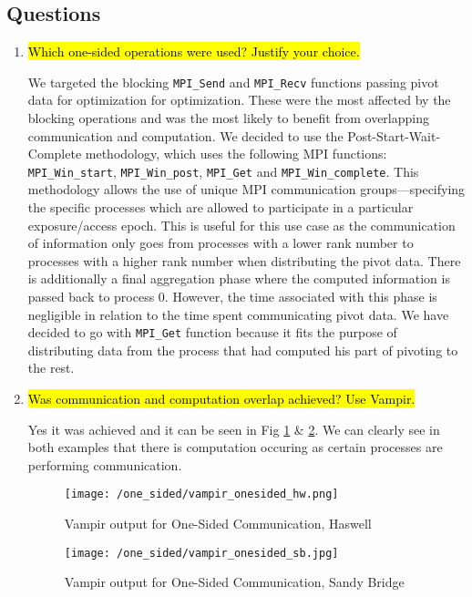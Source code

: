 \subsection{Questions}
\begin{enumerate}
  \item \hl{Which one-sided operations were used? Justify your choice.}

	We targeted the blocking \verb!MPI_Send! and \verb!MPI_Recv! functions passing pivot data for optimization for optimization.
	These were the most affected by the blocking operations and was the most likely to benefit from overlapping communication and computation.
    We decided to use the Post-Start-Wait-Complete methodology, which uses the following 
    MPI functions: \verb!MPI_Win_start!, \verb!MPI_Win_post!, \verb!MPI_Get! and \verb!MPI_Win_complete!. 
    This methodology allows the use of unique MPI communication groups---specifying the specific processes which are allowed to participate in a particular exposure/access epoch.
    This is useful for this use case as the communication of information only goes from processes with a lower rank number to processes with a higher rank number when distributing the pivot data.
    There is additionally a final aggregation phase where the computed information is passed back to process 0.
    However, the time associated with this phase is negligible in relation to the time spent communicating pivot data.
    We have decided to go with \verb!MPI_Get! function because it fits the purpose of distributing
    data from the process that had computed his part of pivoting to the rest.

  \item \hl{Was communication and computation overlap achieved? Use Vampir.}

    Yes it was achieved and it can be seen in Fig \ref{fig:vampir_haswell_one_sided} \& \ref{fig:vampir_sandy_one_sided}. 
    We can clearly see in both examples that there is computation occuring as certain processes are performing communication. 
    \begin{figure}[h] %
	\begin{center}
			\texttt{[image: /one\_sided/vampir\_onesided\_hw.png]}
		\caption{Vampir output for One-Sided Communication, Haswell}
		\label{fig:vampir_haswell_one_sided}
	\end{center}
	\end{figure}
	
	    \begin{figure}[h] %
	\begin{center}
			\texttt{[image: /one\_sided/vampir\_onesided\_sb.jpg]}
		\caption{Vampir output for One-Sided Communication, Sandy Bridge}
		\label{fig:vampir_sandy_one_sided}
	\end{center}
	\end{figure}


\end{enumerate}
